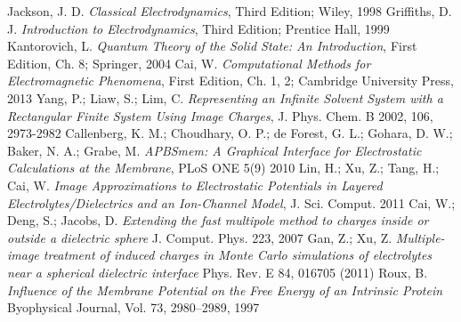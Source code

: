 \documentclass[12pt, notitlepage]{article}
\begin{document}
\begin{thebibliography}{20}
Jackson, J. D. \textit{Classical Electrodynamics}, Third Edition; Wiley, 1998
Griffiths, D. J. \textit{Introduction to Electrodynamics}, Third Edition; Prentice Hall, 1999
Kantorovich, L. \textit{Quantum Theory of the Solid State: An Introduction}, First Edition, Ch. 8; Springer, 2004
Cai, W. \textit{Computational Methods for Electromagnetic Phenomena}, First Edition, Ch. 1, 2; Cambridge University Press, 2013
Yang, P.; Liaw, S.; Lim, C. \textit{Representing an Infinite Solvent System with a Rectangular Finite System Using Image Charges}, J. Phys. Chem. B 2002, 106, 2973-2982
Callenberg, K. M.; Choudhary, O. P.; de Forest, G. L.; Gohara, D. W.; Baker, N. A.; Grabe, M. \textit{APBSmem: A Graphical Interface for Electrostatic Calculations at the Membrane}, PLoS ONE 5(9) 2010
Lin, H.; Xu, Z.; Tang, H.; Cai, W. \textit{Image Approximations to Electrostatic Potentials in Layered Electrolytes/Dielectrics and an Ion-Channel Model}, J. Sci. Comput. 2011
Cai, W.; Deng, S.; Jacobs, D. \textit{Extending the fast multipole method to charges inside or outside a dielectric sphere} J. Comput. Phys. 223, 2007
Gan, Z.; Xu, Z. \textit{Multiple-image treatment of induced charges in Monte Carlo simulations of electrolytes near a spherical dielectric interface} Phys. Rev. E 84, 016705 (2011)
Roux, B. \textit{Influence of the Membrane Potential on the Free Energy of an Intrinsic Protein} Byophysical Journal, Vol. 73, 2980--2989, 1997


\end{thebibliography}


\end{document}

